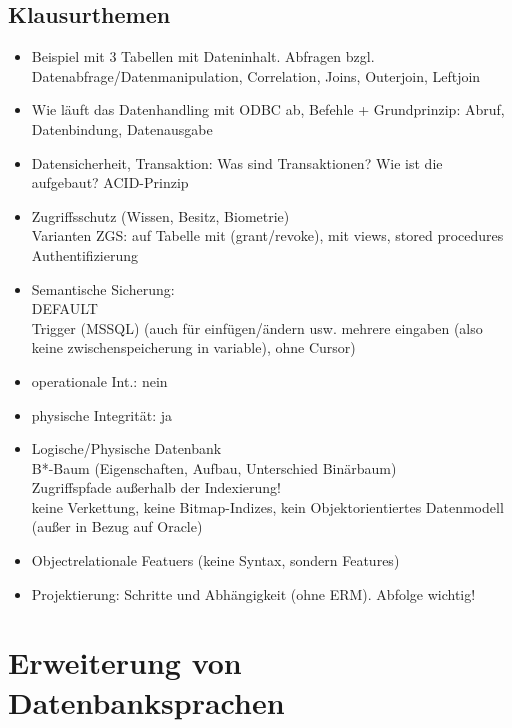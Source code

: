 \section*{Klausurthemen}
\begin{itemize}
\item Beispiel mit 3 Tabellen mit Dateninhalt. Abfragen bzgl. Datenabfrage/Datenmanipulation, Correlation, Joins, Outerjoin, Leftjoin
\item Wie läuft das Datenhandling mit ODBC ab, Befehle + Grundprinzip: Abruf, Datenbindung, Datenausgabe
\item Datensicherheit, Transaktion: Was sind Transaktionen? Wie ist die aufgebaut? ACID-Prinzip
\item Zugriffsschutz (Wissen, Besitz, Biometrie)\\
Varianten ZGS: auf Tabelle mit (grant/revoke), mit views, stored procedures\\
Authentifizierung
\item Semantische Sicherung:\\
DEFAULT\\
Trigger (MSSQL) (auch für einfügen/ändern usw. mehrere eingaben (also keine zwischenspeicherung in variable), ohne Cursor)
\item operationale Int.: nein
\item physische Integrität: ja
\item Logische/Physische Datenbank\\
B*-Baum (Eigenschaften, Aufbau, Unterschied Binärbaum)\\
Zugriffspfade außerhalb der Indexierung!\\
keine Verkettung, keine Bitmap-Indizes, kein Objektorientiertes Datenmodell (außer in Bezug auf Oracle)
\item Objectrelationale Featuers (keine Syntax, sondern Features)
\item Projektierung: Schritte und Abhängigkeit (ohne ERM). Abfolge wichtig!
\end{itemize}

\chapter{Erweiterung von Datenbanksprachen}

